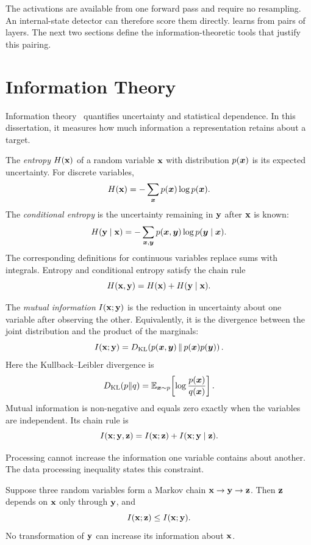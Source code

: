 The activations are available from one forward pass and require no resampling. An
internal-state detector can therefore score them directly.
 learns from pairs of layers. The next two
sections define the information-theoretic tools that justify this pairing.

\section{Information Theory}
\label{sec:bg:infotheory}

Information theory~\citep{shannon1948mathematical} quantifies uncertainty and
statistical dependence. In this dissertation, it measures how much information a
representation retains about a target.

\begin{definition}
The \emph{entropy} $H({\mathbf{x}})$ of a random variable ${\mathbf{x}}$ with distribution
$p({\bm{x}})$ is its expected uncertainty. For discrete variables,
\[
  H({\mathbf{x}})=-\sum_{{\bm{x}}}p({\bm{x}})\log p({\bm{x}}).
\]
The \emph{conditional entropy} is the uncertainty remaining in ${\mathbf{y}}$ after
${\mathbf{x}}$ is known:
\[
  H({\mathbf{y}}\mid{\mathbf{x}})
  =-\sum_{{\bm{x}},{\bm{y}}}p({\bm{x}},{\bm{y}})\log p({\bm{y}}\mid{\bm{x}}).
\]
The corresponding definitions for continuous variables replace sums with
integrals. Entropy and conditional entropy satisfy the chain rule
\[
  H({\mathbf{x}},{\mathbf{y}})=H({\mathbf{x}})+H({\mathbf{y}}\mid{\mathbf{x}}).
\]
\label{def:bg:entropy}
\end{definition}

\begin{definition}
The \emph{mutual information} $I({\mathbf{x}};{\mathbf{y}})$ is the reduction in uncertainty about
one variable after observing the other. Equivalently, it is the divergence between
the joint distribution and the product of the marginals:
\[
  I({\mathbf{x}};{\mathbf{y}})
  =D_{\mathrm{KL}}\!\left(p({\bm{x}},{\bm{y}})\,\middle\|\,p({\bm{x}})p({\bm{y}})\right).
\]
Here the Kullback--Leibler divergence is
\[
  D_{\mathrm{KL}}(p\|q)
  =\mathbb{E}_{{\bm{x}}\sim p}\!\left[\log\frac{p({\bm{x}})}{q({\bm{x}})}\right].
\]
Mutual information is non-negative and equals zero exactly when the variables are
independent. Its chain rule is
\[
  I({\mathbf{x}};{\mathbf{y}},{\mathbf{z}})
  =I({\mathbf{x}};{\mathbf{z}})+I({\mathbf{x}};{\mathbf{y}}\mid{\mathbf{z}}).
\]
\label{def:bg:mi}
\end{definition}

Processing cannot increase the information one variable contains about another.
The data processing inequality states this constraint.

\begin{definition}
Suppose three random variables form a Markov chain
${\mathbf{x}}\rightarrow{\mathbf{y}}\rightarrow{\mathbf{z}}$. Then ${\mathbf{z}}$ depends on ${\mathbf{x}}$ only through
${\mathbf{y}}$, and
\[
  I({\mathbf{x}};{\mathbf{z}})\le I({\mathbf{x}};{\mathbf{y}}).
\]
No transformation of ${\mathbf{y}}$ can increase its information about ${\mathbf{x}}$.
\label{def:bg:dpi}
\end{definition}

